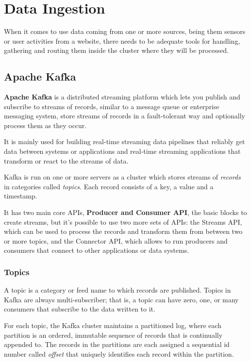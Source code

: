 \chapter{Data Ingestion}

When it comes to use data coming from one or more sources, being them sensors or user activities from a website, there needs to be adequate tools for handling, gathering and routing them inside the cluster where they will be processed.

\section{Apache Kafka}

\textbf{Apache Kafka} is a distributed streaming platform which lets you publish and subscribe to streams of records, similar to a message queue or enterprise messaging system, store streams of records in a fault-tolerant way and optionally process them as they occur. 

It is mainly used for building real-time streaming data pipelines that reliably get data between systems or applications and real-time streaming applications that transform or react to the streams of data.

Kafka is run on one or more servers as a cluster which stores streams of \textit{records} in categories called \textit{topics}. Each record consists of a key, a value and a timestamp.

It has two main core APIs, \textbf{Producer and Consumer API}, the basic blocks to create streams, but it's possible to use two more sets of APIs: the Streams API, which can be used to process the records and transform them from between two or more topics, and the Connector API, which allows to run producers and consumers that connect to other applications or data systems.

\subsection{Topics}

A topic is a category or feed name to which records are published. Topics in Kafka are always multi-subscriber; that is, a topic can have zero, one, or many consumers that subscribe to the data written to it.

For each topic, the Kafka cluster maintains a partitioned log, where each partition is an ordered, immutable sequence of records that is continually appended to. The records in the partitions are each assigned a sequential id number called \textit{offset} that uniquely identifies each record within the partition.

